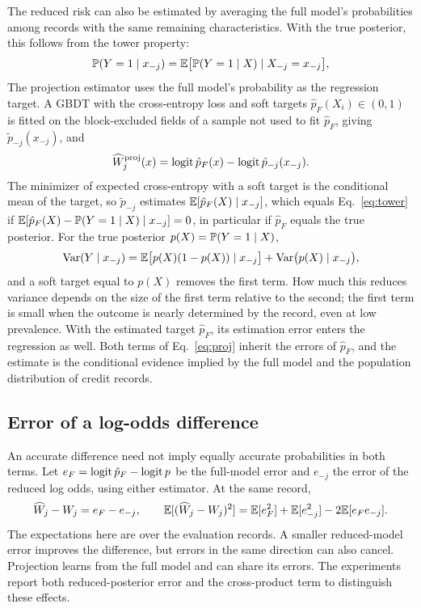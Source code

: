The reduced risk can also be estimated by averaging the full model's probabilities among records with the same remaining characteristics. With the true posterior, this follows from the tower property:
\begin{equation}\label{eq:tower}
\mathbb P(Y=1\mid x_{-j})=\mathbb E\bigl[\mathbb P(Y=1\mid X)\mid X_{-j}=x_{-j}\bigr],
\end{equation}
The projection estimator uses the full model's probability as the regression target. A GBDT with the cross-entropy loss and soft targets $\hat p_F(X_i)\in(0,1)$ is fitted on the block-excluded fields of a sample not used to fit $\hat p_F$, giving $\tilde p_{-j}(x_{-j})$, and
\begin{equation}\label{eq:proj}
\widehat W_j^{\rm proj}(x)=\operatorname{logit}\hat p_F(x)-\operatorname{logit}\tilde p_{-j}(x_{-j}).
\end{equation}
The minimizer of expected cross-entropy with a soft target is the conditional mean of the target, so $\tilde p_{-j}$ estimates $\mathbb E[\hat p_F(X)\mid x_{-j}]$, which equals Eq.~\eqref{eq:tower} if $\mathbb E[\hat p_F(X)-\mathbb P(Y=1\mid X)\mid x_{-j}]=0$, in particular if $\hat p_F$ equals the true posterior. For the true posterior $p(X)=\mathbb P(Y=1\mid X)$,
\[
\operatorname{Var}(Y\mid x_{-j})=\mathbb E\bigl[p(X)(1-p(X))\mid x_{-j}\bigr]+\operatorname{Var}\bigl(p(X)\mid x_{-j}\bigr),
\]
and a soft target equal to $p(X)$ removes the first term. How much this reduces variance depends on the size of the first term relative to the second; the first term is small when the outcome is nearly determined by the record, even at low prevalence. With the estimated target $\hat p_F$, its estimation error enters the regression as well. Both terms of Eq.~\eqref{eq:proj} inherit the errors of $\hat p_F$, and the estimate is the conditional evidence implied by the full model and the population distribution of credit records.

\subsection{Error of a log-odds difference}

An accurate difference need not imply equally accurate probabilities in both terms. Let $e_F=\operatorname{logit}\hat p_F-\operatorname{logit} p$ be the full-model error and $e_{-j}$ the error of the reduced log odds, using either estimator. At the same record,
\begin{equation}\label{eq:error_difference}
\widehat W_j-W_j=e_F-e_{-j},\qquad
\mathbb E[(\widehat W_j-W_j)^2]=\mathbb E[e_F^2]+\mathbb E[e_{-j}^2]-2\mathbb E[e_Fe_{-j}].
\end{equation}
The expectations here are over the evaluation records. A smaller reduced-model error improves the difference, but errors in the same direction can also cancel. Projection learns from the full model and can share its errors. The experiments report both reduced-posterior error and the cross-product term to distinguish these effects.

